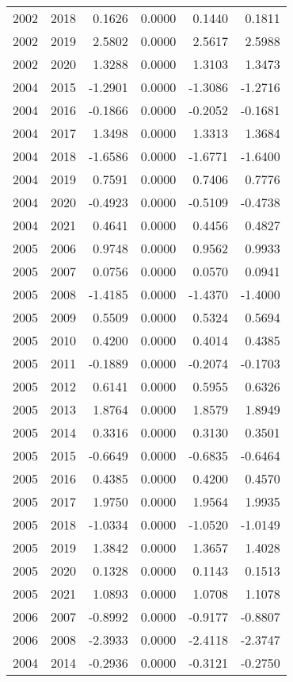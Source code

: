 \begin{tabular}{llrrrr}
2002 & 2018 & 0.1626 & 0.0000 & 0.1440 & 0.1811 \\
2002 & 2019 & 2.5802 & 0.0000 & 2.5617 & 2.5988 \\
2002 & 2020 & 1.3288 & 0.0000 & 1.3103 & 1.3473 \\
2004 & 2015 & -1.2901 & 0.0000 & -1.3086 & -1.2716 \\
2004 & 2016 & -0.1866 & 0.0000 & -0.2052 & -0.1681 \\
2004 & 2017 & 1.3498 & 0.0000 & 1.3313 & 1.3684 \\
2004 & 2018 & -1.6586 & 0.0000 & -1.6771 & -1.6400 \\
2004 & 2019 & 0.7591 & 0.0000 & 0.7406 & 0.7776 \\
2004 & 2020 & -0.4923 & 0.0000 & -0.5109 & -0.4738 \\
2004 & 2021 & 0.4641 & 0.0000 & 0.4456 & 0.4827 \\
2005 & 2006 & 0.9748 & 0.0000 & 0.9562 & 0.9933 \\
2005 & 2007 & 0.0756 & 0.0000 & 0.0570 & 0.0941 \\
2005 & 2008 & -1.4185 & 0.0000 & -1.4370 & -1.4000 \\
2005 & 2009 & 0.5509 & 0.0000 & 0.5324 & 0.5694 \\
2005 & 2010 & 0.4200 & 0.0000 & 0.4014 & 0.4385 \\
2005 & 2011 & -0.1889 & 0.0000 & -0.2074 & -0.1703 \\
2005 & 2012 & 0.6141 & 0.0000 & 0.5955 & 0.6326 \\
2005 & 2013 & 1.8764 & 0.0000 & 1.8579 & 1.8949 \\
2005 & 2014 & 0.3316 & 0.0000 & 0.3130 & 0.3501 \\
2005 & 2015 & -0.6649 & 0.0000 & -0.6835 & -0.6464 \\
2005 & 2016 & 0.4385 & 0.0000 & 0.4200 & 0.4570 \\
2005 & 2017 & 1.9750 & 0.0000 & 1.9564 & 1.9935 \\
2005 & 2018 & -1.0334 & 0.0000 & -1.0520 & -1.0149 \\
2005 & 2019 & 1.3842 & 0.0000 & 1.3657 & 1.4028 \\
2005 & 2020 & 0.1328 & 0.0000 & 0.1143 & 0.1513 \\
2005 & 2021 & 1.0893 & 0.0000 & 1.0708 & 1.1078 \\
2006 & 2007 & -0.8992 & 0.0000 & -0.9177 & -0.8807 \\
2006 & 2008 & -2.3933 & 0.0000 & -2.4118 & -2.3747 \\
2004 & 2014 & -0.2936 & 0.0000 & -0.3121 & -0.2750 \\

\end{tabular}

